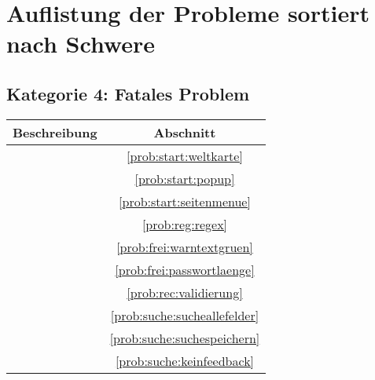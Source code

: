 \section{Auflistung der Probleme sortiert nach Schwere}

\subsection*{Kategorie 4: Fatales Problem}
\begin{tabular}{|p{12cm}|c|}
\hline
\textbf{Beschreibung} & \textbf{Abschnitt} \\
\hline\hline
\nameref{prob:start:weltkarte} & \ref{prob:start:weltkarte} \\ 
\nameref{prob:start:popup} & \ref{prob:start:popup}\\
\nameref{prob:start:seitenmenue} & \ref{prob:start:seitenmenue}\\
\nameref{prob:reg:regex} & \ref{prob:reg:regex}\\
\nameref{prob:frei:warntextgruen} & \ref{prob:frei:warntextgruen}\\
\nameref{prob:frei:passwortlaenge} & \ref{prob:frei:passwortlaenge}\\
\nameref{prob:rec:validierung} & \ref{prob:rec:validierung}\\
\nameref{prob:suche:sucheallefelder} & \ref{prob:suche:sucheallefelder}\\
\nameref{prob:suche:suchespeichern} & \ref{prob:suche:suchespeichern}\\
\nameref{prob:suche:keinfeedback} & \ref{prob:suche:keinfeedback}\\
\hline
\end{tabular}

